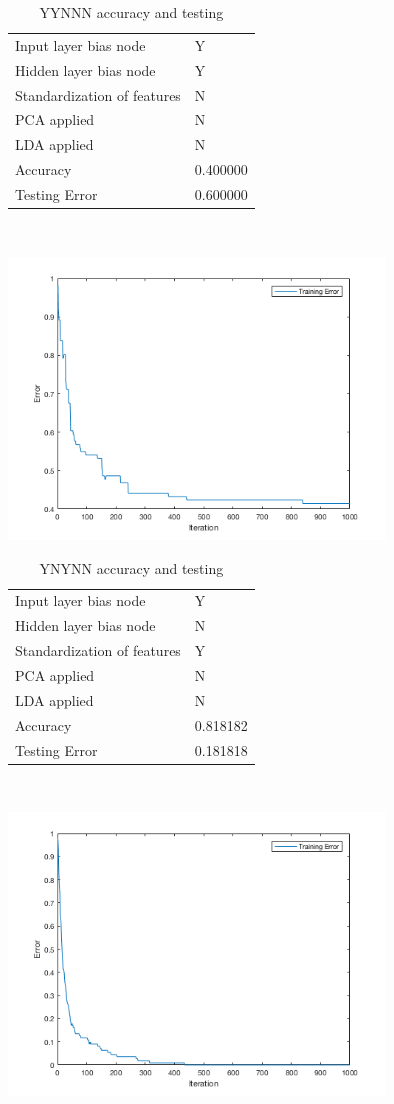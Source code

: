\documentclass[12pt]{article}
\newcommand{\accuracyAndTestErrorTable}[8]{
  \begin{tabular}{l|l}
    \hline
    Input layer bias node & #1 \\
    Hidden layer bias node & #2 \\
    Standardization of features & #3 \\
    PCA applied & #4 \\
    LDA applied & #5 \\
    \hline
    Accuracy & #6 \\
    Testing Error & #7 \\
    \hline
  \end{tabular}
  ~\\[60pt]
  \caption{#8}
}
\begin{document}



\begin{center}
  \begin{table}[H]
    \begin{varwidth}[b]{0.4\linewidth}
      \centering
      \accuracyAndTestErrorTable{Y}{Y}{N}{N}{N}{0.400000}{0.600000}{YYNNN accuracy and testing}
      \label{table:YYNNN}
    \end{varwidth}%
    \hfill
    \begin{minipage}[b]{0.6\linewidth}
      \centering
      \includegraphics[width=100mm]{YYNNN_training_error.png}
      \label{fig:YYNNN}
    \end{minipage}
  \end{table}
\end{center}

\begin{center}
  \begin{table}[H]
    \begin{varwidth}[b]{0.4\linewidth}
      \centering
      \accuracyAndTestErrorTable{Y}{N}{Y}{N}{N}{0.818182}{0.181818}{YNYNN accuracy and testing}
      \label{table:YNYNN}
    \end{varwidth}%
    \hfill
    \begin{minipage}[b]{0.6\linewidth}
      \centering
      \includegraphics[width=100mm]{YNYNN_training_error.png}
      \label{fig:YNYNN}
    \end{minipage}
  \end{table}
\end{center}
\end{document}

